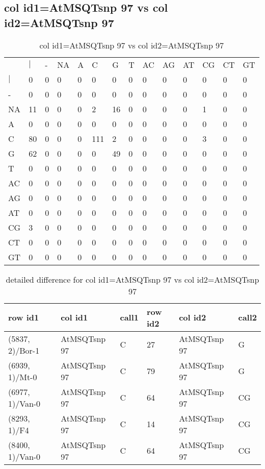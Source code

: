 \subsection{col id1=AtMSQTsnp 97 vs col id2=AtMSQTsnp 97}
\begin{center}
\begin{longtable}{|l|l|l|l|l|l|l|l|l|l|l|l|l|l|}
\caption{col id1=AtMSQTsnp 97 vs col id2=AtMSQTsnp 97} \label{table_dm978}\\
\hline
\\
\hline
&$|$&-&NA&A&C&G&T&AC&AG&AT&CG&CT&GT\\
$|$&0&0&0&0&0&0&0&0&0&0&0&0&0\\
-&0&0&0&0&0&0&0&0&0&0&0&0&0\\
NA&11&0&0&0&2&16&0&0&0&0&1&0&0\\
A&0&0&0&0&0&0&0&0&0&0&0&0&0\\
C&80&0&0&0&111&2&0&0&0&0&3&0&0\\
G&62&0&0&0&0&49&0&0&0&0&0&0&0\\
T&0&0&0&0&0&0&0&0&0&0&0&0&0\\
AC&0&0&0&0&0&0&0&0&0&0&0&0&0\\
AG&0&0&0&0&0&0&0&0&0&0&0&0&0\\
AT&0&0&0&0&0&0&0&0&0&0&0&0&0\\
CG&3&0&0&0&0&0&0&0&0&0&0&0&0\\
CT&0&0&0&0&0&0&0&0&0&0&0&0&0\\
GT&0&0&0&0&0&0&0&0&0&0&0&0&0\\
\hline
\end{longtable}
\end{center}

\begin{center}
\begin{longtable}{|l|l|l|l|l|l|}
\caption{detailed difference for col id1=AtMSQTsnp 97 vs col id2=AtMSQTsnp 97} \label{table_dm979}\\
\hline
row id1&col id1&call1&row id2&col id2&call2\\
\hline
(5837, 2)/Bor-1&AtMSQTsnp 97&C&27&AtMSQTsnp 97&G\\
(6939, 1)/Mt-0&AtMSQTsnp 97&C&79&AtMSQTsnp 97&G\\
(6977, 1)/Van-0&AtMSQTsnp 97&C&64&AtMSQTsnp 97&CG\\
(8293, 1)/F4&AtMSQTsnp 97&C&14&AtMSQTsnp 97&CG\\
(8400, 1)/Van-0&AtMSQTsnp 97&C&64&AtMSQTsnp 97&CG\\
\hline
\end{longtable}
\end{center}

